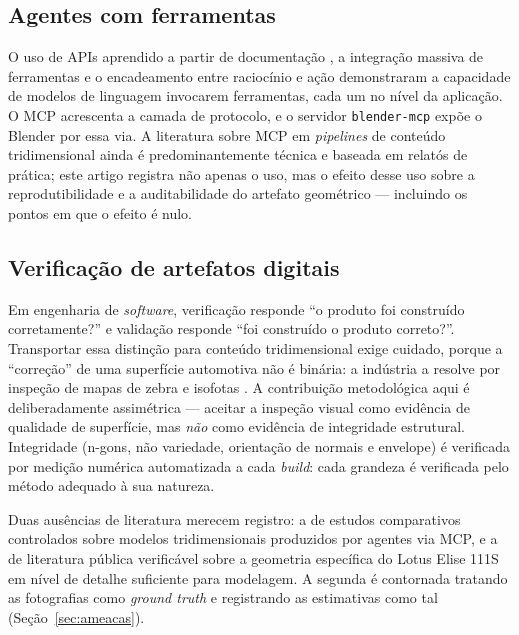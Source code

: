 \subsection{Agentes com ferramentas}

O uso de APIs aprendido a partir de documenta\c{c}\~ao \cite{schick2023, patil2023}, a
integra\c{c}\~ao massiva de ferramentas \cite{qin2023} e o encadeamento entre
racioc\'inio e a\c{c}\~ao \cite{yao2023} demonstraram a capacidade de modelos de
linguagem invocarem ferramentas, cada um no n\'ivel da aplica\c{c}\~ao. O MCP
\cite{mcpspec2024} acrescenta a camada de protocolo, e o servidor \texttt{blender-mcp}
\cite{blendermcp2025} exp\~oe o Blender por essa via. A literatura sobre MCP em
\emph{pipelines} de conte\'udo tridimensional ainda \'e predominantemente t\'ecnica e
baseada em relat\'os de pr\'atica; este artigo registra n\~ao apenas o uso, mas o efeito
desse uso sobre a reprodutibilidade e a auditabilidade do artefato geom\'etrico ---
incluindo os pontos em que o efeito \'e nulo.

\subsection{Verifica\c{c}\~ao de artefatos digitais}

Em engenharia de \emph{software}, verifica\c{c}\~ao responde ``o produto foi
constru\'ido corretamente?'' e valida\c{c}\~ao responde ``foi constru\'ido o produto
correto?''. Transportar essa distin\c{c}\~ao para conte\'udo tridimensional exige
cuidado, porque a ``corre\c{c}\~ao'' de uma superf\'icie automotiva n\~ao \'e bin\'aria:
a ind\'ustria a resolve por inspe\c{c}\~ao de mapas de zebra e isofotas
\cite{halstead1993}. A contribui\c{c}\~ao metodol\'ogica aqui \'e deliberadamente
assim\'etrica --- aceitar a inspe\c{c}\~ao visual como evid\^encia de qualidade de
superf\'icie, mas \emph{n\~ao} como evid\^encia de integridade estrutural. Integridade
(n-gons, n\~ao variedade, orienta\c{c}\~ao de normais e envelope) \'e verificada por
medi\c{c}\~ao num\'erica automatizada a cada \emph{build}: cada grandeza \'e verificada
pelo m\'etodo adequado \`a sua natureza.

Duas aus\^encias de literatura merecem registro: a de estudos comparativos controlados
sobre modelos tridimensionais produzidos por agentes via MCP, e a de literatura
p\'ublica verific\'avel sobre a geometria espec\'ifica do Lotus Elise 111S em n\'ivel de
detalhe suficiente para modelagem. A segunda \'e contornada tratando as fotografias como
\emph{ground truth} e registrando as estimativas como tal
(Se\c{c}\~ao~\ref{sec:ameacas}).

